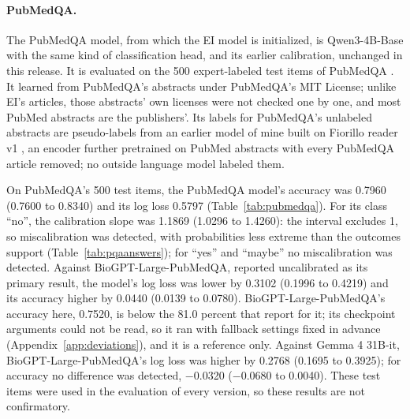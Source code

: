 \documentclass[11pt,letterpaper]{article}
\begin{document}
\paragraph{PubMedQA.} The PubMedQA model, from which the EI model is initialized, is Qwen3-4B-Base with the same kind of classification head, and its earlier calibration, unchanged in this release. It is evaluated on the 500 expert-labeled test items of PubMedQA \citep{jin2019}. It learned from PubMedQA's abstracts under PubMedQA's MIT License; unlike EI's articles, those abstracts' own licenses were not checked one by one, and most PubMed abstracts are the publishers'. Its labels for PubMedQA's unlabeled abstracts are pseudo-labels from an earlier model of mine built on Fiorillo reader v1 \citep{reader1}, an encoder further pretrained on PubMed abstracts with every PubMedQA article removed; no outside language model labeled them.

On PubMedQA's 500 test items, the PubMedQA model's accuracy was 0.7960 (0.7600 to 0.8340) and its log loss 0.5797 (Table~\ref{tab:pubmedqa}). For its class ``no'', the calibration slope was 1.1869 (1.0296 to 1.4260): the interval excludes 1, so miscalibration was detected, with probabilities less extreme than the outcomes support (Table~\ref{tab:pqaanswers}); for ``yes'' and ``maybe'' no miscalibration was detected. Against BioGPT-Large-PubMedQA, reported uncalibrated as its primary result, the model's log loss was lower by 0.3102 (0.1996 to 0.4219) and its accuracy higher by 0.0440 (0.0139 to 0.0780). BioGPT-Large-PubMedQA's accuracy here, 0.7520, is below the 81.0 percent that \citet{luo2022} report for it; its checkpoint arguments could not be read, so it ran with fallback settings fixed in advance (Appendix~\ref{app:deviations}), and it is a reference only. Against Gemma 4 31B-it, BioGPT-Large-PubMedQA's log loss was higher by 0.2768 (0.1695 to 0.3925); for accuracy no difference was detected, $-$0.0320 ($-$0.0680 to 0.0040). These test items were used in the evaluation of every version, so these results are not confirmatory.
\end{document}
